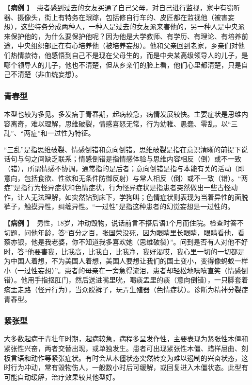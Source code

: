 【\textbf{病例}
】　{患者感到过去的女友买通了自己父母，对自己进行监视，家中有窃听器、摄像头，街上有特务在跟踪，包括修自行车的、皮匠都在监视他（被害妄想），这些特务分成两种人，一种人是过去的女友派来害他的，另一种人是中央派来保护他的，为什么要保护他呢？因为他是大学教师、有学历、有理论、有培养前途，中央组织部正在有心培养他（被培养妄想）。他和父亲回到老家，乡亲们对他们热情款待，他感悟到自己不是现在父母生的，而是中央某高级领导人的儿子，是哪个领导人的儿子，他也不清楚，但从乡亲们的脸上看，他们心里都清楚，只是自己不清楚（非血统妄想）。}

\subsubsection{青春型}

本型也较为多见。多发病于青春期，起病较急，病情发展较快。主要症状是思维内容离奇，难以理解，思维破裂，情感喜怒无常，行为幼稚、愚蠢、零乱。以``三乱''、``两症''和一过性为特征。

``三乱''是指思维破裂、情感倒错和意向倒错。思维破裂是指在意识清晰的前提下说话句与句之间缺乏联系；情感倒错是指情感体验与思维内容相反（倒）或不一致（错），所谓情感不协调，通常指的是后者；意向倒错是指与本能有关的活动（即意向，包括食欲、性欲和无条件防御反射）与常人相反（倒）或不一致（错）。``两症''是指行为怪异症状和色情症状，行为怪异症状是指患者突然做出一些古怪动作，让人无法理解，如突然钻到床下，学狗叫；色情症状则表现为当着异性的面脱裤子，触摸异性，纠缠异性。``一过性''是指这种患者的幻觉妄想是一过性的。

【\textbf{病例}
】　{男性，18岁，冲动毁物，说话前言不搭后语1个月而住院。检查时答不切题，问他年龄，答``百分之百，张国荣没死，因为眼睛里长眼睛，眼睛看他，看蔡亦银，他是我老婆，你不知道我多喜欢她（思维破裂）''。问到是否有人对他不好时，答``他要害我，比我高，比我白，比我净，我好渴哎，我心里一切的一切都是为中国人着想，不为美国人着想，美国人要想让我们的国土变小，变得像蚂蚁一样小（一过性妄想）''。患者的母亲在一旁急得流泪，患者却轻松地嘻嘻直笑（情感倒错）。他用手指抠肛门，然后送进嘴里吮，喝痰盂里的痰（意向倒错），一只脚套着痰盂走路（怪异行为），当众脱裤子，玩弄生殖器（色情症状）。诊断为精神分裂症青春型。}

\subsubsection{紧张型}

大多数起病于青壮年时期，起病较急，病程多呈发作性，主要表现为紧张性木僵和紧张性兴奋，两者交替出现，或单独发生。患者可出现紧张性木僵、蜡样屈曲、刻板言语和动作等紧张症状。有时会从木僵状态突然转变为难以遏制的兴奋状态，这时行为冲动，常有毁物伤人，一般数小时后可缓解，或回复进入木僵状态。此型有可能自动缓解，治疗效果较其他型好。

